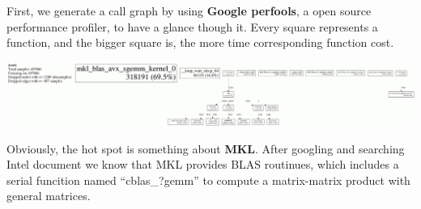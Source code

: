 \documentclass{article}
\begin{document}
\noindent{}First, we generate a call graph by using \textbf{Google perfools},
 a open source performance profiler, to have a glance though it. Every
 square represents a function, and the bigger square is, the more time
 corresponding function cost.%

\includegraphics[keepaspectratio=true,width=\dimmin{}{\dimwidth{0.90}}]{images/100001994364201}{}%

\noindent{}Obviously, the hot spot is something about \textbf{MKL}. After googling
and searching Intel document we know that MKL provides BLAS routinues,
which includes a serial funcition named \textquotedblleft{}cblas\_?gemm\textquotedblright{}
to compute a matrix-matrix product with general matrices.%
\end{document}
